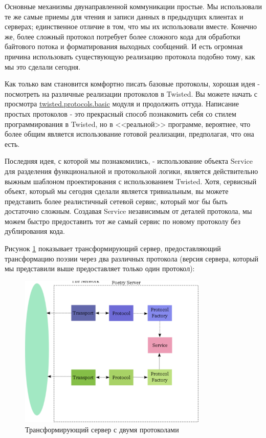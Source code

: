 Основные механизмы двунаправленной коммуникации простые. 
Мы использовали те же самые приемы для чтения и 
записи данных в предыдущих клиентах и серверах; 
единственное отличие в том, что мы их использовали вместе. 
Конечно же, более сложный протокол потребует более 
сложного кода для обработки байтового потока и 
форматирования выходных сообщений. И есть огромная причина 
использовать существующую реализацию протокола подобно тому, 
как мы это сделали сегодня.


Как только вам становится комфортно писать базовые протоколы, 
хорошая идея - посмотреть на различные реализации протоколов в Twisted. 
Вы можете начать с просмотра 
\href{http://twistedmatrix.com/trac/browser/tags/releases/twisted-8.2.0/twisted/protocols/basic.py}{twisted.protocols.basic} модуля и продолжить оттуда. Написание 
простых протоколов - это прекрасный способ познакомить 
себя со стилем программирования в Twisted, но в 
<<реальной>> программе, вероятнее, что более общим 
является использование готовой реализации, предполагая, что 
она есть.
 

Последняя идея, с которой мы познакомились, - использование 
объекта Service для разделения функциональной и протокольной 
логики, является действительно выжным шаблоном проектирования 
с использованием Twisted. Хотя, сервисный 
объект, который мы сегодня сделали является тривиальным, 
вы можете представить более реалистичный сетевой сервис, 
который мог бы быть достаточно сложным. Создавая Service независимым от
деталей протокола, мы можем быстро предоставить тот же самый сервис 
по новому протоколу без дублирования кода.


Рисунок \ref{fig:server-21} показывает трансформирующий сервер, 
предоставляющий трансформацию поэзии через два различных 
протокола (версия сервера, который мы представили выше предоставляет 
только один протокол):

\begin{figure}[h]
\begin{center}
    \includegraphics[width=0.8\textwidth]{images/server-21.pdf}
    \caption{Трансформирующий сервер с двумя протоколами\label{fig:server-21}}
\end{center}
\end{figure}

